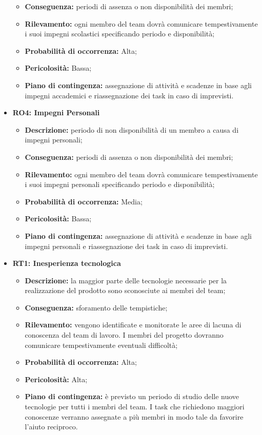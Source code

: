 \begin{itemize}
\begin{itemize}
		\item \textbf{Conseguenza:} periodi di assenza o non disponibilità dei membri;
		\item \textbf{Rilevamento:} ogni membro del team dovrà comunicare tempestivamente i suoi impegni scolastici specificando periodo e disponibilità;
		\item \textbf{Probabilità di occorrenza:} Alta;
		\item \textbf{Pericolosità:} Bassa;
		\item \textbf{Piano di contingenza:} assegnazione di attività e scadenze in base agli impegni accademici e riassegnazione dei task in caso di imprevisti.
	\end{itemize}
	\item \textbf{RO4: Impegni Personali}
	\begin{itemize}
		\item \textbf{Descrizione:} periodo di non disponibilità di un membro a causa di impegni personali;
		\item \textbf{Conseguenza:} periodi di assenza o non disponibilità dei membri;
		\item \textbf{Rilevamento:} ogni membro del team dovrà comunicare tempestivamente i suoi impegni personali specificando periodo e disponibilità;
		\item \textbf{Probabilità di occorrenza:} Media;
		\item \textbf{Pericolosità:} Bassa;
		\item \textbf{Piano di contingenza:} assegnazione di attività e scadenze in base agli impegni personali e riassegnazione dei task in caso di imprevisti.
	\end{itemize}
	\item \textbf{RT1: Inesperienza tecnologica}
	\begin{itemize}
		\item \textbf{Descrizione:} la maggior parte delle tecnologie necessarie per la realizzazione del prodotto sono sconosciute ai membri del team;
		\item \textbf{Conseguenza:} sforamento delle tempistiche;
		\item \textbf{Rilevamento:} vengono identificate e monitorate le aree di lacuna di conoscenza del team di lavoro. I membri del progetto dovranno comunicare tempestivamente eventuali difficoltà;
		\item \textbf{Probabilità di occorrenza:} Alta;
		\item \textbf{Pericolosità:} Alta;
		\item \textbf{Piano di contingenza:} è previsto un periodo di studio delle nuove tecnologie per tutti i membri del team. I task che richiedono maggiori conoscenze verranno assegnate a più membri in modo tale da favorire l'aiuto reciproco.

\end{itemize}
\end{itemize}
